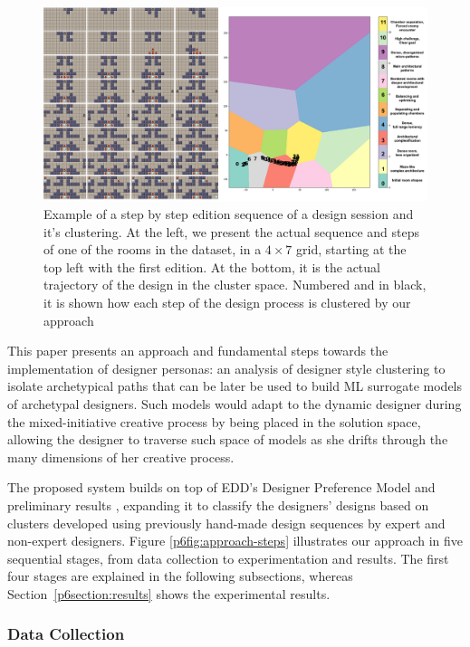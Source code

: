 \begin{figure}
\centerline{\includegraphics[width=\textwidth]{figures/representative-clusters-small.png}}
\caption{Example of a step by step edition sequence of a design session and it's clustering. At the left, we present the actual sequence and steps of one of the rooms in the dataset, in a $4\times7$ grid, starting at the top left with the first edition. At the bottom, it is the actual trajectory of the design in the cluster space. Numbered and in black, it is shown how each step of the design process is clustered by our approach} \label{p6fig:paths-designers}
\end{figure}

This paper presents an approach and fundamental steps towards the implementation of designer personas: an analysis of designer style clustering to isolate archetypical paths that can be later be used to build ML surrogate models of archetypal designers. Such models would adapt to the dynamic designer during the mixed-initiative creative process by being placed in the solution space, allowing the designer to traverse such space of models as she drifts through the many dimensions of her creative process.

The proposed system builds on top of EDD's Designer Preference Model and preliminary results , expanding it to classify the designers' designs based on clusters developed using previously hand-made design sequences by expert and non-expert designers. Figure \ref{p6fig:approach-steps} illustrates our approach in five sequential stages, from data collection to experimentation and results. The first four stages are explained in the following subsections, whereas Section~\ref{p6section:results} shows the experimental results.

\subsubsection{Data Collection}

